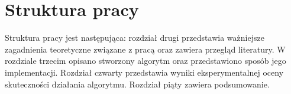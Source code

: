 \section{Struktura pracy}
Struktura pracy jest następująca: rozdział drugi przedstawia ważniejsze zagadnienia teoretyczne związane z pracą oraz zawiera przegląd literatury.
W rozdziale trzecim opisano stworzony algorytm oraz przedstawiono sposób jego implementacji. 
Rozdział czwarty przedstawia wyniki eksperymentalnej oceny skuteczności działania algorytmu.
Rozdział piąty zawiera podsumowanie.


